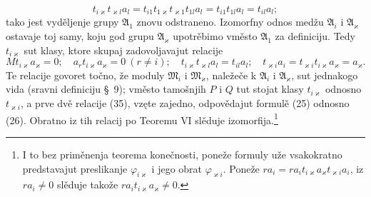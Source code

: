 \documentclass[11pt]{article}
\begin{document}
\[
 t_{i\varkappa}t_{\varkappa l}a_l=t_{i1}t_{1\varkappa}t_{\varkappa1}t_{1l}a_l
 =t_{i1}t_{1l}a_l=t_{il}a_l;
\]
tako jest vyděljenje grupy \(\mathfrak A_1\) znovu odstraneno. Izomorfny odnos medžu \(\mathfrak A_i\) i \(\mathfrak A_\varkappa\) ostavaje toj samy, koju god grupu \(\mathfrak A_\varkappa\) upotrěbimo vměsto \(\mathfrak A_1\) za definiciju. Tedy \(t_{i\varkappa}\) sut klasy, ktore skupaj zadovoljavajut relacije
\begin{equation}
 Mt_{i\varkappa}a_\varkappa=0;
 \quad a_rt_{i\varkappa}a_\varkappa=0\ (r\ne i);
 \quad t_{i\varkappa}t_{\varkappa l}a_l=t_{il}a_l;
 \quad t_{\varkappa i}a_i=t_{\varkappa i}t_{i\varkappa}a_\varkappa=a_\varkappa.
\tag{35}
\end{equation}
Te relacije govoret točno, že moduly \(\mathfrak M_i\) i \(\mathfrak M_\varkappa\), naležeče k \(\mathfrak A_i\) i \(\mathfrak A_\varkappa\), sut jednakogo vida (sravni definiciju \S~9); vměsto tamošnjih \(P\) i \(Q\) tut stojat klasy \(t_{i\varkappa}\) odnosno \(t_{\varkappa i}\), a prve dvě relacije (35), vzęte zajedno, odpovědajut formulě (25) odnosno (26). Obratno iz tih relacij po Teoremu VI slěduje izomorfija.\footnote{I to bez priměnenja teorema konečnosti, poneže formuly uže vsakokratno predstavajut preslikanje \(\varphi_{i\varkappa}\) i jego obrat \(\varphi_{\varkappa i}\). Poneže \(ra_i=ra_it_{i\varkappa}a_\varkappa t_{\varkappa i}a_i\), iz \(ra_i\ne0\) slěduje takože \(ra_it_{i\varkappa}a_\varkappa\ne0\).}
\end{document}

